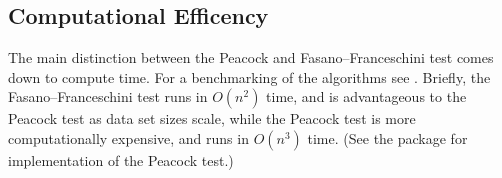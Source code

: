 \documentclass[codesnippet]{jss}
\begin{document}
\subsection{Computational Efficency}
The main distinction between the Peacock and Fasano--Franceschini test comes down to compute time. For a benchmarking of the algorithms see \citep{Lopes2007}.  Briefly,
the Fasano--Franceschini test runs in $O(n^2)$ time, and is advantageous to the Peacock test as data set sizes scale, while the Peacock test is more computationally expensive, and runs in $O(n^3)$ time.
%
(See the  package for  implementation of the Peacock test.)
\end{document}
